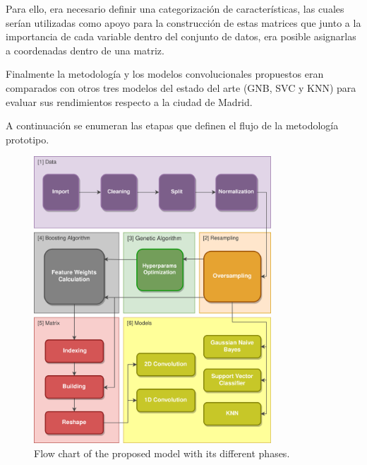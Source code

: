 \documentclass{uathesis-es}
\begin{document}
{	Para ello, era necesario definir una categorización de características, las cuales serían utilizadas como apoyo para la construcción de estas matrices que junto a la importancia de cada variable dentro del conjunto de datos, era posible asignarlas a coordenadas dentro de una matriz.
	
	Finalmente la metodología y los modelos convolucionales propuestos eran comparados con otros tres modelos del estado del arte (GNB, SVC y KNN) para evaluar sus rendimientos respecto a la ciudad de Madrid.
	
	A continuación se enumeran las etapas que definen el flujo de la metodología prototipo.
	
	\begin{figure}[H]
		\centering
		\includegraphics[width=3.5in]{Figures/1stPaper/Data_flow.png}
		\caption{Flow chart of the proposed model with its different phases.}
		\label{figDegree}
	\end{figure}
	
}
\end{document}
